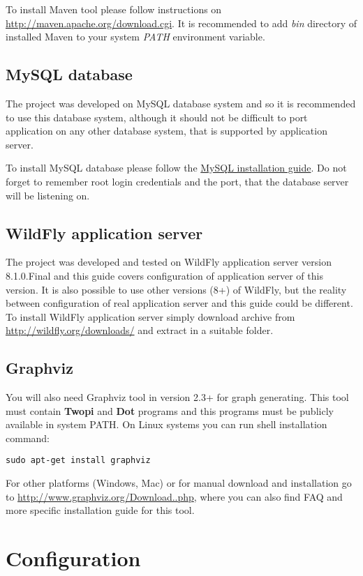 \documentclass[12pt,a4paper]{article}
\begin{document}
To install Maven tool please follow instructions on \url{http://maven.apache.org/download.cgi}. It is recommended to add \textit{bin} directory of installed Maven to your system \textit{PATH} environment variable.

\subsection{MySQL database}
The project was developed on MySQL database system and so it is recommended to use this database system, although it should not be difficult to port application on any other database system, that is supported by application server.

To install MySQL database please follow the \href{http://dev.mysql.com/doc/refman/5.6/en/installing.html}{MySQL installation guide}. Do not forget to remember root login credentials and the port, that the database server will be listening on.

\subsection{WildFly application server}
The project was developed and tested on WildFly application server version 8.1.0.Final and this guide covers configuration of application server of this version. It is also possible to use other versions (8+) of WildFly, but the reality between configuration of real application server and this guide could be different.
To install WildFly application server simply download archive from \url{http://wildfly.org/downloads/} and extract in a suitable folder.

\subsection{Graphviz}
You will also need Graphviz tool in version 2.3+ for graph generating. This tool must contain \textbf{Twopi} and \textbf{Dot} programs and this programs must be publicly available in system PATH. On Linux systems you can run shell installation command:
\begin{lstlisting}
sudo apt-get install graphviz
\end{lstlisting}
For other platforms (Windows, Mac) or for manual download and installation go to \url{http://www.graphviz.org/Download..php}, where you can also find FAQ and more specific installation guide for this tool.

\section{Configuration}
\end{document}
